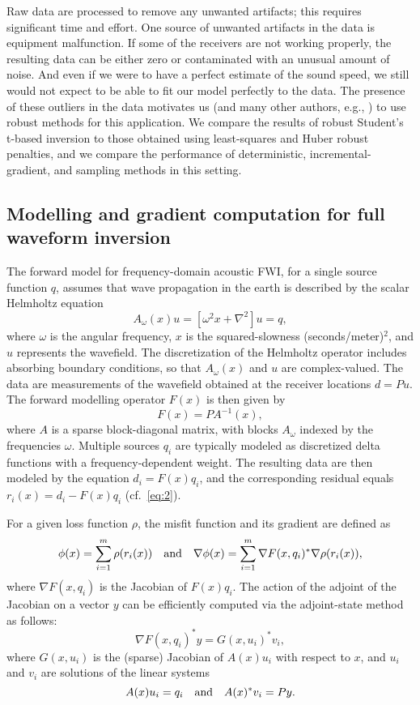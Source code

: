 \documentclass[nospthms]{svjour3}
\numberwithin{equation}{section}
\def\text #1{\hbox{\quad#1\quad}}
\begin{document}
Raw data are processed to remove any unwanted artifacts; this requires
significant time and effort.  One source of unwanted artifacts in the
data is equipment malfunction.  If some of the receivers are not
working properly, the resulting data can be either zero or
contaminated with an unusual amount of noise. And even if we were to
have a perfect estimate of the sound speed, we still would not expect
to be able to fit our model perfectly to the data. The presence of
these outliers in the data motivates us (and many other authors, e.g.,
\cite{Bube1997,Symes2003,Brossier2010}) to use robust methods for this
application.  We compare the results of robust Student's t-based
inversion to those obtained using least-squares and Huber robust
penalties, and we compare the performance of deterministic,
incremental-gradient, and sampling methods in this setting.

\subsection{Modelling and gradient computation for full waveform
  inversion}

The forward model for frequency-domain acoustic FWI, for a single
source function $q$, assumes that wave propagation in the earth is described by
the scalar Helmholtz equation
\begin{equation*}
  A_{\omega}(x)u = [\omega^2 x + \nabla^2]u = q,
\end{equation*}
where $\omega$ is the angular frequency, $x$ is the squared-slowness
(seconds/meter)$^2$, and $u$ represents the wavefield.  The
discretization of the Helmholtz operator includes absorbing boundary
conditions, so that $A_{\omega}(x)$ and $u$ are complex-valued.  The
data are measurements of the wavefield obtained at the receiver
locations $d = Pu$. The forward modelling operator $F(x)$ is then
given by
\begin{equation*}
  F(x) = PA^{-1}(x),
\end{equation*}
where $A$ is a sparse block-diagonal matrix, with blocks $A_{\omega}$
indexed by the frequencies $\omega$. Multiple sources $q_i$ are
typically modeled as discretized delta functions with a
frequency-dependent weight.  The resulting data are then modeled by
the equation $d_i = F(x)q_i$, and the corresponding residual equals
$r_i(x) = d_i - F(x)q_i$ (cf.~\eqref{eq:2}).

For a given loss function $\rho$, the misfit function and its
gradient are  defined as
\begin{equation*}
 \phi(x)=\sum_{i=1}^{m}\rho(r_i(x))
 \text{and}
 \nabla\phi(x)=\sum_{i=1}^m \nabla F(x,q_i)^*\nabla\rho(r_i(x)),
\end{equation*}
where $\nabla F(x,q_i)$ is the Jacobian of $F(x)q_i$.  The action of the adjoint
of the Jacobian on a vector $y$ can be efficiently computed via the
adjoint-state method \cite{Tarantola1984} as follows:
\begin{equation*}
\nabla F(x, q_i)^*y = G(x,u_i)^*v_i,
\end{equation*}
where $G(x,u_i)$ is the (sparse) Jacobian of $A(x)u_i$ with respect to
$x$, and $u_i$ and $v_i$ are solutions of the linear systems
\[
A(x)u_i = q_i \text{and} A(x)^*v_i = Py.
\]
\end{document}
